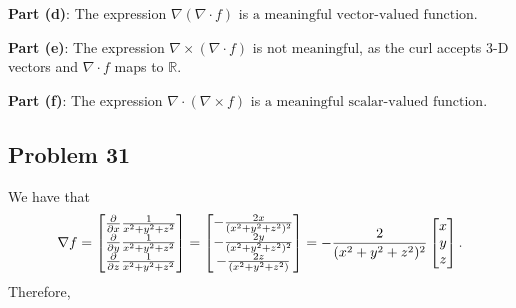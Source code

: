 \documentclass[11pt]{article}
\renewcommand{\grad}{\nabla}
\begin{document}
\textbf{Part (d)}: The expression $\grad (\grad \cdot f)$ is $\boxed{\text{a meaningful vector-valued function}}$.

\textbf{Part (e)}: The expression $\grad \times (\grad \cdot f)$ is $\boxed{\text{not meaningful}}$, as the curl accepts 3-D vectors and $\grad \cdot f$ maps to $\mathbb{R}$.

\textbf{Part (f)}: The expression $\grad \cdot (\grad \times f)$ is $\boxed{\text{a meaningful scalar-valued function}}$.


\subsection*{Problem 31}

We have that
\[
	\grad f = \begin{bmatrix} \pdv{x} \tfrac{1}{x^{2} + y^{2} + z^{2}} \\ \pdv{y} \tfrac{1}{x^{2} + y^{2} + z^{2}} \\ \pdv{z} \tfrac{1}{x^{2} + y^{2} + z^{2}} \end{bmatrix} = \begin{bmatrix} - \tfrac{2x}{(x^{2} + y^{2} + z^{2})^{2}} \\ -\tfrac{2y}{(x^{2} + y^{2} + z^{2})^{2}} \\ -\tfrac{2z}{(x^{2} + y^{2} + z^{2})} \end{bmatrix} = -\frac{2}{(x^{2} + y^{2} + z^{2})^{2}} \begin{bmatrix} x \\ y \\ z \end{bmatrix}.
\]
Therefore,
\end{document}

